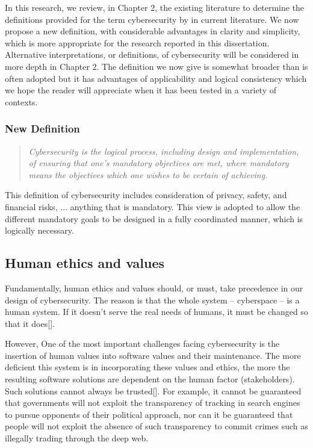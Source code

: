 In this research, we review, in Chapter 2,  the existing literature to determine the definitions provided for the term cybersecurity by in current literature. We now  propose a new definition, with considerable advantages in clarity and simplicity, 
which is more appropriate for the research reported in this dissertation. Alternative interpretations, or definitions, of cybersecurity will be considered in more depth in Chapter 2.  The definition we now give is somewhat broader than is often adopted
but it has advantages of applicability and logical consistency which
we hope the reader will appreciate when it has been tested in a 
variety of contexts.

\subsubsection*{New Definition}
\begin{quote} \em Cybersecurity is the logical process, including design and implementation, of ensuring that one's mandatory objectives are met, where mandatory means the objectives which one wishes to be certain of achieving.\end{quote}

This definition of cybersecurity includes consideration of privacy, safety, and financial risks, ...
anything that is mandatory. This view is adopted to allow the different mandatory goals
to be designed in a fully coordinated manner, which is logically necessary.

\subsection{Human ethics and values}
Fundamentally, human ethics and values should, or must, take precedence in our design of cybersecurity. The reason is that the whole system -- cyberspace -- is a human system. If it doesn't serve the real needs of humans, it must be changed so that it does[]. 

However, One of the most important challenges facing cybersecurity is the insertion of human values into software values and their maintenance.   
The more deficient this system is in incorporating these values and ethics, the more the resulting software solutions are dependent on the human factor (stakeholders). Such solutions cannot always be trusted[]. For example, it cannot be guaranteed that governments will not exploit the transparency of tracking in search engines to pursue opponents of their political approach, nor can it be guaranteed that people will not exploit the absence of such transparency to commit crimes  such as illegally trading through the deep web. 


